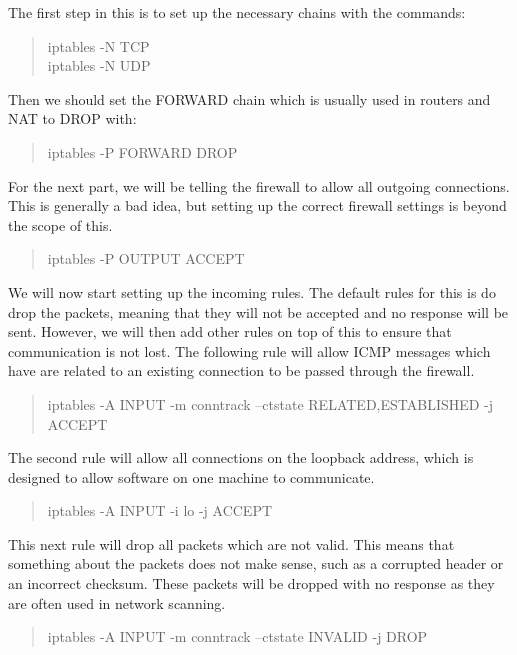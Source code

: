 \documentclass[a4paper,11pt]{report}
\begin{document}
						The first step in this is to set up the necessary chains with the commands:
						\begin{quote}
							iptables -N TCP \\
							iptables -N UDP \\ 
						\end{quote}
						Then we should set the FORWARD chain which is usually used in routers and NAT to DROP with:
						\begin{quote}
							iptables -P FORWARD DROP
						\end{quote}
						For the next part, we will be telling the firewall to allow all outgoing connections. 
						This is generally a bad idea, but setting up the correct firewall settings is beyond the scope of this. 
						\begin{quote}
							iptables -P OUTPUT ACCEPT
						\end{quote}
						We will now start setting up the incoming rules. 
						The default rules for this is do drop the packets, meaning that they will not be accepted and no response will be sent. 
						However, we will then add other rules on top of this to ensure that communication is not lost. 
						The following rule will allow ICMP messages which have are related to an existing connection to be passed through the firewall. 
						\begin{quote}
							iptables -A INPUT -m conntrack --ctstate RELATED,ESTABLISHED -j ACCEPT
						\end{quote}
						The second rule will allow all connections on the loopback address, which is designed to allow software on one machine to communicate. 
						\begin{quote}
							iptables -A INPUT -i lo -j ACCEPT
						\end{quote}
						This next rule will drop all packets which are not valid. 
						This means that something about the packets does not make sense, such as a corrupted header or an incorrect checksum. 
						These packets will be dropped with no response as they are often used in network scanning. 
						\begin{quote}
							iptables -A INPUT -m conntrack --ctstate INVALID -j DROP
						\end{quote}
\end{document}
